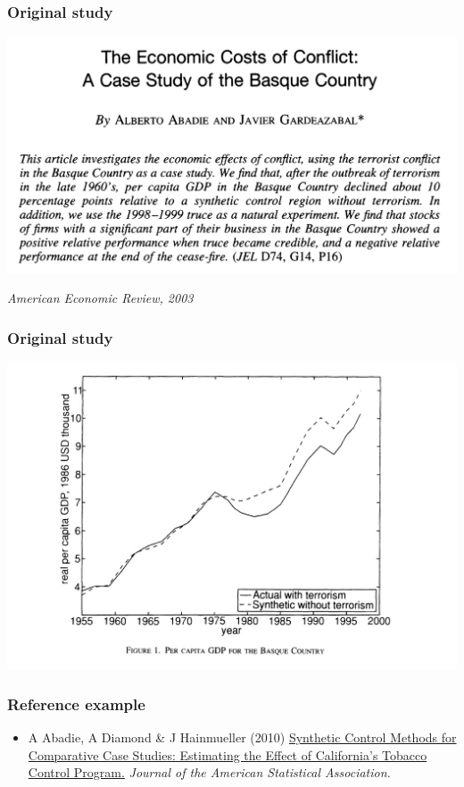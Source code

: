\documentclass[aspectratio=43]{beamer}
\begin{document}
\begin{frame}
\frametitle{Original study}
\centering

\includegraphics[width = \textwidth]{../img/abadie2003}

\textit{American Economic Review, 2003}

\end{frame}

\begin{frame}
\frametitle{Original study}
\centering

\includegraphics[width = \textwidth]{../img/abadie2003b}

\end{frame}

\begin{frame}
\frametitle{Reference example}
\centering

\begin{itemize}
  \item A Abadie, A Diamond \& J Hainmueller (2010) \href{https://web.stanford.edu/~jhain/Paper/JASA2010.pdf}{Synthetic Control Methods for Comparative Case Studies: Estimating the Effect of California's Tobacco Control Program.} \textit{Journal of the American Statistical Association.}
\end{itemize}

\end{frame}
\end{document}

